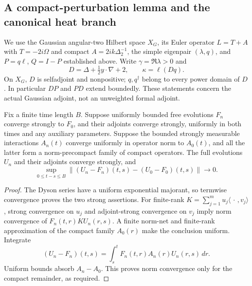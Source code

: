 \subsection{A compact-perturbation lemma and the canonical heat branch}
\label{sec:short-seed-canonical}

We use the Gaussian angular-two Hilbert space $X_G$, its Euler operator
$L=T+A$ with $T=-2i\Omega$ and compact $A=2ik\Delta_2^{-1}$,
the simple eigenpair $(\lambda,q)$, and $P=q\ell$, $Q=I-P$ established
above. Write $\gamma=\Re\lambda>0$ and
\[
 D=\Delta+\tfrac12y\cdot\nabla+2,\qquad \kappa=\ell(Dq).
\]
On $X_G$, $D$ is selfadjoint and nonpositive; $q,q^\dagger$ belong to
every power domain of $D$. In particular $DP$ and $PD$ extend boundedly.
These statements concern the actual Gaussian adjoint, not an unweighted
formal adjoint.

\begin{lemma}\label{lem:short-compact-duhamel}
Fix a finite time length $B$. Suppose uniformly bounded free evolutions
$F_n$ converge strongly to $F_0$, and their adjoints converge strongly,
uniformly in both times and any auxiliary parameters. Suppose the bounded
strongly measurable interactions $A_n(t)$ converge uniformly in operator
norm to $A_0(t)$,
and all the latter form a norm-precompact family of compact operators.
The full evolutions $U_n$ and their adjoints converge strongly, and
\[
 \sup_{0\le t-s\le B}
 \|(U_n-F_n)(t,s)-(U_0-F_0)(t,s)\|\longrightarrow0.
\]
\end{lemma}
\begin{proof}
The Dyson series have a uniform exponential majorant, so termwise
convergence proves the two strong assertions. For finite-rank
$K=\sum_{j=1}^m u_j\langle\,\cdot\,,v_j\rangle$, strong convergence
on $u_j$ and adjoint-strong convergence on $v_j$ imply norm convergence
of $F_n(t,r)KU_n(r,s)$. A finite norm-net and finite-rank approximation
of the compact family $A_0(r)$ make the conclusion uniform. Integrate
\[
 (U_n-F_n)(t,s)=\int_s^tF_n(t,r)A_n(r)U_n(r,s)\,dr.
\]
Uniform bounds absorb $A_n-A_0$. This proves norm convergence only for
the compact remainder, as required.
\end{proof}

